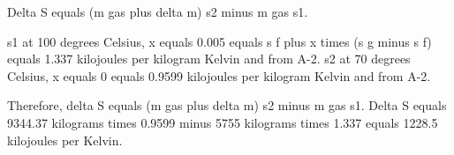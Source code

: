 Delta S equals (m gas plus delta m) s2 minus m gas s1.  

s1 at 100 degrees Celsius, x equals 0.005 equals s f plus x times (s g minus s f) equals 1.337 kilojoules per kilogram Kelvin and from A-2.  
s2 at 70 degrees Celsius, x equals 0 equals 0.9599 kilojoules per kilogram Kelvin and from A-2.  

Therefore, delta S equals (m gas plus delta m) s2 minus m gas s1.  
Delta S equals 9344.37 kilograms times 0.9599 minus 5755 kilograms times 1.337 equals 1228.5 kilojoules per Kelvin.
